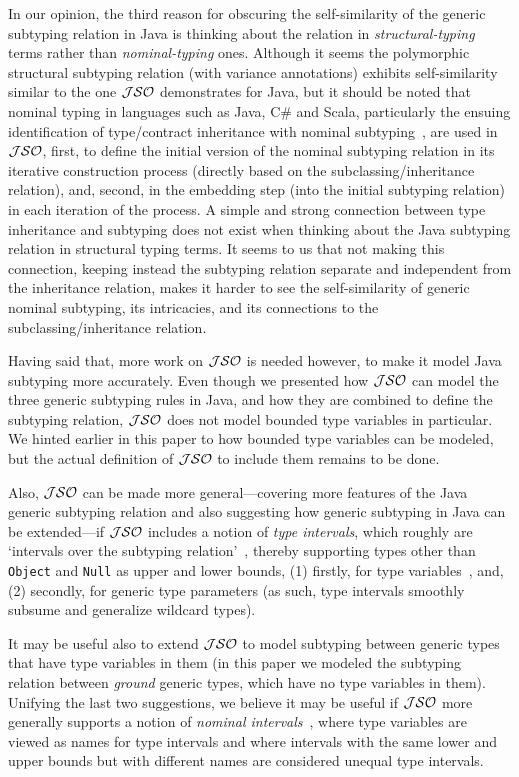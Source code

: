 \documentclass[twocolumn,english]{article}
\numberwithin{equation}{section}
\numberwithin{figure}{section}
\newcommand{\code}[1]{\texttt{#1}}
\begin{document}
In our opinion, the third reason for obscuring the self-similarity
of the generic subtyping relation in Java is thinking about the relation
in \emph{structural-typing} terms rather than \emph{nominal-typing}
ones. Although it seems the polymorphic structural subtyping relation
(with variance annotations) exhibits self-similarity similar to the
one $\mathcal{JSO}$ demonstrates for Java, but it should be noted that nominal
typing in languages such as Java, C\# and Scala, particularly the
ensuing identification of type/contract inheritance with nominal subtyping~\cite{InhSubtyNWPT13,NOOPsumm,AbdelGawad2015},
are used in $\mathcal{JSO}$, first, to define the initial version of the nominal
subtyping relation in its iterative construction process (directly
based on the subclassing/inheritance relation), and, second, in the
embedding step (into the initial subtyping relation) in each iteration
of the process. A simple and strong connection between type inheritance
and subtyping does not exist when thinking about the Java subtyping
relation in structural typing terms. It seems to us that not making
this connection, keeping instead the subtyping relation separate and
independent from the inheritance relation, makes it harder to see
the self-similarity of generic nominal subtyping, its intricacies,
and its connections to the subclassing/inheritance relation.

Having said that, more work on $\mathcal{JSO}$ is needed however, to make
it model Java subtyping more accurately. Even though we presented
how $\mathcal{JSO}$ can model the three generic subtyping rules in Java, and
how they are combined to define the subtyping relation, $\mathcal{JSO}$ does
not model bounded type variables in particular. We hinted earlier
in this paper to how bounded type variables can be modeled, but the
actual definition of $\mathcal{JSO}$ to include them remains to be done.

Also, $\mathcal{JSO}$ can be made more general---covering more features of
the Java generic subtyping relation and also suggesting how generic
subtyping in Java can be extended---if $\mathcal{JSO}$ includes a notion of
\emph{type intervals}, which roughly are `intervals over the subtyping
relation'~\cite{AbdelGawad2014b}, thereby supporting types other
than \code{Object} and \code{Null} as upper and lower bounds, (1)
firstly, for type variables~\cite{SmithCompleting07,SmithJava08,SmithDesigning10},
and, (2) secondly, for generic type parameters (as such, type intervals
smoothly subsume and generalize wildcard types).

It may be useful also to extend $\mathcal{JSO}$ to model subtyping between
generic types that have type variables in them (in this paper we modeled
the subtyping relation between \emph{ground} generic types, which
have no type variables in them). Unifying the last two suggestions,
we believe it may be useful if $\mathcal{JSO}$ more generally supports a notion
of \emph{nominal intervals}~\cite{AbdelGawad2016c}, where type variables
are viewed as names for type intervals and where intervals with the
same lower and upper bounds but with different names are considered
unequal type intervals.
\end{document}
